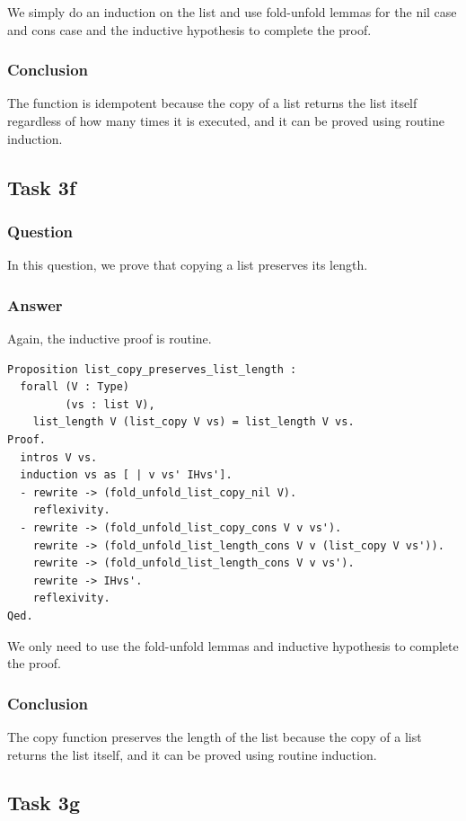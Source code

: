 \documentclass{article}
\begin{document}
We simply do an induction on the list and use fold-unfold lemmas for the nil case and cons case and the inductive hypothesis to complete the proof.

\subsubsection{Conclusion}
The function is idempotent because the copy of a list returns the list itself regardless of how many times it is executed, and it can be proved using routine induction.

\subsection{Task 3f}
\subsubsection{Question}
In this question, we prove that copying a list preserves its length.

\subsubsection{Answer}
Again, the inductive proof is routine.

\begin{lstlisting}
Proposition list_copy_preserves_list_length :
  forall (V : Type)
         (vs : list V),
    list_length V (list_copy V vs) = list_length V vs.
Proof.
  intros V vs.
  induction vs as [ | v vs' IHvs'].
  - rewrite -> (fold_unfold_list_copy_nil V).
    reflexivity.
  - rewrite -> (fold_unfold_list_copy_cons V v vs').
    rewrite -> (fold_unfold_list_length_cons V v (list_copy V vs')).
    rewrite -> (fold_unfold_list_length_cons V v vs').    
    rewrite -> IHvs'.
    reflexivity.
Qed.
\end{lstlisting}
We only need to use the fold-unfold lemmas and inductive hypothesis to complete the proof.

\subsubsection{Conclusion}
The copy function preserves the length of the list because the copy of a list returns the list itself, and it can be proved using routine induction.

\subsection{Task 3g}
\end{document}
